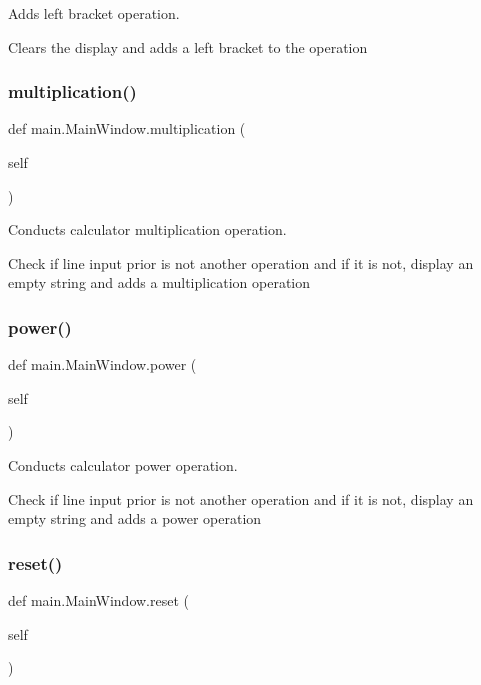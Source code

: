 Adds left bracket operation. 

Clears the display and adds a left bracket to the operation \mbox{\label{classmain_1_1_main_window_ac01c5ab4257a8aac093821c829ebbcd2}} 
\subsubsection{\texorpdfstring{multiplication()}{multiplication()}}
{\footnotesize\ttfamily def main.\+Main\+Window.\+multiplication (\begin{DoxyParamCaption}\item[{}]{self }\end{DoxyParamCaption})}



Conducts calculator multiplication operation. 

Check if line input prior is not another operation and if it is not, display an empty string and adds a multiplication operation \mbox{\label{classmain_1_1_main_window_a477f4d4d5bb5ef2805a250a36745ab4b}} 
\subsubsection{\texorpdfstring{power()}{power()}}
{\footnotesize\ttfamily def main.\+Main\+Window.\+power (\begin{DoxyParamCaption}\item[{}]{self }\end{DoxyParamCaption})}



Conducts calculator power operation. 

Check if line input prior is not another operation and if it is not, display an empty string and adds a power operation \mbox{\label{classmain_1_1_main_window_a8e489d6d240a339dceb8258429fe1fc9}} 
\subsubsection{\texorpdfstring{reset()}{reset()}}
{\footnotesize\ttfamily def main.\+Main\+Window.\+reset (\begin{DoxyParamCaption}\item[{}]{self }\end{DoxyParamCaption})}



